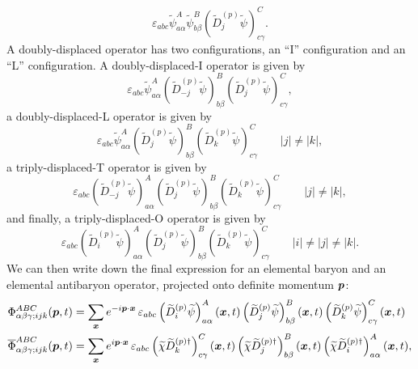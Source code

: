     \begin{equation}
        \varepsilon_{a b c} \widetilde{\psi}_{a \alpha}^{A} \widetilde{\psi}_{b \beta}^{B}\left(\widetilde{D}_{j}^{(p)} \widetilde{\psi}\right)_{c \gamma}^{C}.
    \end{equation}
    A doubly-displaced operator has two configurations, an ``I'' configuration and an ``L'' configuration. A doubly-displaced-I operator is given by
    \begin{equation}
        \varepsilon_{a b c} \widetilde{\psi}_{a \alpha}^{A}\left(\widetilde{D}_{-j}^{(p)} \widetilde{\psi}\right)_{b \beta}^{B}\left(\widetilde{D}_{j}^{(p)} \widetilde{\psi}\right)_{c \gamma}^{C},
    \end{equation}
    a doubly-displaced-L operator is given by
    \begin{equation}
        \varepsilon_{a b c} \widetilde{\psi}_{a \alpha}^{A}\left(\widetilde{D}_{j}^{(p)} \widetilde{\psi}\right)_{b \beta}^{B}\left(\widetilde{D}_{k}^{(p)} \widetilde{\psi}\right)_{c \gamma}^{C} \qquad |j| \neq |k|,
    \end{equation}
    a triply-displaced-T operator is given by
    \begin{equation}
        \varepsilon_{a b c}\left(\widetilde{D}_{-j}^{(p)} \widetilde{\psi}\right)_{a \alpha}^{A}\left(\widetilde{D}_{j}^{(p)} \widetilde{\psi}\right)_{b \beta}^{B}\left(\widetilde{D}_{k}^{(p)} \widetilde{\psi}\right)_{c \gamma}^{C} \qquad |j| \neq |k|,
    \end{equation}
    and finally, a triply-displaced-O operator is given by
    \begin{equation}
        \varepsilon_{a b c}\left(\widetilde{D}_{i}^{(p)} \widetilde{\psi}\right)_{a \alpha}^{A}\left(\widetilde{D}_{j}^{(p)} \widetilde{\psi}\right)_{b \beta}^{B}\left(\widetilde{D}_{k}^{(p)} \widetilde{\psi}\right)_{c \gamma}^{C} \qquad |i| \neq |j| \neq |k|.
    \end{equation}
    We can then write down the final expression for an elemental baryon and an elemental antibaryon operator, projected onto definite momentum $\boldsymbol{p}$:
    \begin{equation}
        \begin{aligned}
        \Phi_{\alpha \beta \gamma ; i j k}^{A B C}(\boldsymbol{p}, t) &= \sum_{\boldsymbol{x}} e^{-i\boldsymbol{p} \cdot \boldsymbol{x}}\, \varepsilon_{a b c}\left(\widetilde{D}_{i}^{(p)} \widetilde{\psi}\right)_{a \alpha}^{A}(\boldsymbol{x}, t)\left(\widetilde{D}_{j}^{(p)} \widetilde{\psi}\right)_{b \beta}^{B}(\boldsymbol{x}, t)\left(\widetilde{D}_{k}^{(p)} \widetilde{\psi}\right)_{c \gamma}^{C}(\boldsymbol{x}, t) \\
        \overline\Phi_{\alpha \beta \gamma ; i j k}^{A B C}(\boldsymbol{p}, t) &= \sum_{\boldsymbol{x}} e^{i\boldsymbol{p} \cdot \boldsymbol{x}}\, \varepsilon_{a b c}\left(\widetilde{\chi} \widetilde{D}_{k}^{(p)\dagger} \right)_{c \gamma}^{C}(\boldsymbol{x}, t)\left(\widetilde{\chi}\widetilde{D}_{j}^{(p)\dagger}\right)_{b \beta}^{B}(\boldsymbol{x}, t)\left(\widetilde{\chi}\widetilde{D}_{i}^{(p)\dagger}\right)_{a \alpha}^{A}(\boldsymbol{x}, t),
        \end{aligned}
    \end{equation}
